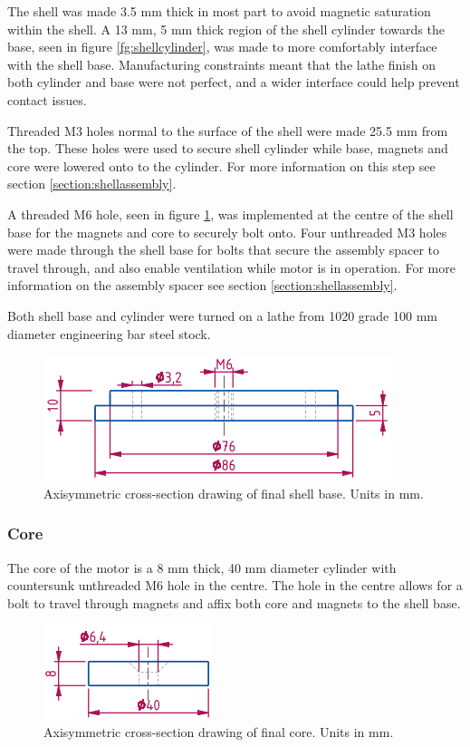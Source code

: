 \documentclass[a4paper,12pt]{article}
\begin{document}
The shell was made 3.5 mm thick in most part to avoid magnetic saturation within the shell. A 13 mm, 5 mm thick region of the shell cylinder towards the base, seen in figure \ref{fg:shellcylinder}, was made to more comfortably interface with the shell base. Manufacturing constraints meant that the lathe finish on both cylinder and base were not perfect, and a wider interface could help prevent contact issues.

Threaded M3 holes normal to the surface of the shell were made 25.5 mm from the top. These holes were used to secure shell cylinder while base, magnets and core were lowered onto to the cylinder. For more information on this step see section \ref{section:shellassembly}.

A threaded M6 hole, seen in figure \ref{fg:shellbase}, was implemented at the centre of the shell base for the magnets and core to securely bolt onto. Four unthreaded M3 holes were made through the shell base for bolts that secure the assembly spacer to travel through, and also enable ventilation while motor is in operation. For more information on the assembly spacer see section \ref{section:shellassembly}.

Both shell base and cylinder were turned on a lathe from 1020 grade 100 mm diameter engineering bar steel stock.

\begin{figure}[h!]
    \centering
    \includegraphics[scale=0.5]{shellbase.png}
    \caption{Axisymmetric cross-section drawing of final shell base. Units in mm.}
    \label{fg:shellbase}
\end{figure}

\subsubsection{Core}

The core of the motor is a 8 mm thick, 40 mm diameter cylinder with countersunk unthreaded M6 hole in the centre. The hole in the centre allows for a bolt to travel through magnets and affix both core and magnets to the shell base.

\begin{figure}[h!]
    \centering
    \includegraphics[scale=0.5]{core.png}
    \caption{Axisymmetric cross-section drawing of final core. Units in mm.}
    \label{fg:core}
\end{figure}
\end{document}
